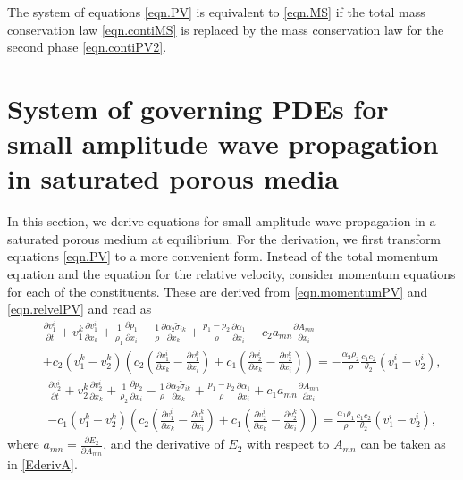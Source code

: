 \documentclass[3p,times,table]{article}
\begin{document}
The system of equations \eqref{eqn.PV} is equivalent to \eqref{eqn.MS} if the
total mass conservation law 
\eqref{eqn.contiMS} is replaced by the mass conservation law for the second phase 
\eqref{eqn.contiPV2}.
 
\section{System of governing PDEs for small amplitude wave propagation in  
saturated porous media}\label{sec.linear}

In this section, we derive equations for small amplitude wave 
propagation in a saturated porous medium at equilibrium. For the 
derivation, we first transform equations \eqref{eqn.PV} to a more convenient form. 
Instead of the total momentum equation 
and the equation for the relative velocity, consider momentum equations for each of the
constituents. These are derived from \eqref{eqn.momentumPV} and 
\eqref{eqn.relvelPV} and read as
\begin{eqnarray}\label{eqns.momentum1.quasilinear}
&&\frac{\partial v^i_1}{\partial t}+v^k_1\frac{\partial v^i_1}{\partial x_k}+
\frac{1}{\rho_1}\frac{\partial p_1}{\partial x_i}- \frac{1}{\rho}
\frac{\partial \alpha_2 \tilde \sigma_{ik}}{\partial x_k}+\frac{p_1-p_2}{\rho}\frac{\partial \alpha_1}{\partial x_i} 
-c_2a_{mn}\frac{\partial A_{mn}}{\partial x_i}\\ \nonumber
&&+c_2(v^k_1-v^k_2)\left(c_2\left(\frac{\partial v^i_1}{\partial x_k}-\frac{\partial v^k_1}{\partial x_i}\right)+c_1\left(\frac{\partial v^i_2}{\partial x_k}-\frac{\partial v^k_2}{\partial x_i}\right) \right)
=-\frac{\alpha_2 \rho_2}{\rho} \frac{c_1c_2}{\theta_2}(v_1^i-v_2^i),
\end{eqnarray}
\begin{eqnarray} \label{eqns.momentum2.quasilinear}
&&\frac{\partial v^i_2}{\partial t}+v^k_2\frac{\partial v^i_2}{\partial x_k}+
\frac{1}{\rho_2}\frac{\partial p_2}{\partial x_i}- \frac{1}{\rho}
\frac{\partial \alpha_2 \tilde \sigma_{ik}}{\partial x_k}+\frac{p_1-p_2}{\rho}\frac{\partial \alpha_1}{\partial x_i} 
+c_1a_{mn}\frac{\partial A_{mn}}{\partial x_i}\\ \nonumber
&&-c_1(v^k_1-v^k_2)\left(c_2\left(\frac{\partial v^i_1}{\partial x_k}-\frac{\partial v^k_1}{\partial x_i}\right)+c_1\left(\frac{\partial v^i_2}{\partial x_k}-\frac{\partial v^k_2}{\partial x_i}\right) \right)
=\frac{\alpha_1 \rho_1}{\rho} \frac{c_1c_2}{\theta_2}(v_1^i-v_2^i),
\end{eqnarray}
where $a_{mn}=\frac{\partial E_2}{\partial A_{mn}}$, and the derivative of $E_2$ with respect to $A_{mn}$ can be taken as in \eqref{EderivA}.
\end{document}
